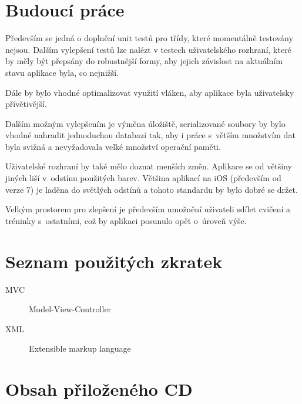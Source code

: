 \documentclass[thesis=B,czech]{FITthesis}[2012/06/26]
\begin{document}
\chapter{Budoucí práce}

	Především se jedná o doplnění unit testů pro třídy, které momentálně testovány nejsou. Dalším vylepšení testů lze nalézt v testech uživatelského rozhraní, které by měly být přepsány do robustnější formy, aby jejich závislost na aktuálním stavu aplikace byla, co nejnižší.

	Dále by bylo vhodné optimalizovat využití vláken, aby aplikace byla uživatelsky přívětivější.

	Dalším možným vylepšením je výměna úložiště, serializované soubory by bylo vhodné nahradit jednoduchou databazí tak, aby i práce s~větším množstvím dat byla svižná a nevyžadovala velké množství operační paměti.

	Uživatelské rozhraní by také mělo doznat menších změn. Aplikace se od většiny jiných liší v~odstínu použitých barev. Většina aplikací na iOS (především od verze 7) je laděna do světlých odstínů a tohoto standardu by bylo dobré se držet.

	Velkým prostorem pro zlepšení je především umožnění uživateli sdílet cvičení a tréninky s~ostatními, což by aplikaci posunulo opět o~úroveň výše.




\appendix

\chapter{Seznam použitých zkratek}
\begin{description}
	\item[MVC] Model-View-Controller
	\item[XML] Extensible markup language
\end{description}

\chapter{Obsah přiloženého CD}


\end{document}

